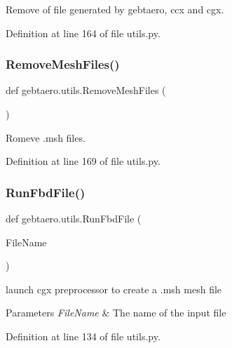 Remove of file generated by gebtaero, ccx and cgx. 



Definition at line 164 of file utils.\+py.

\mbox{\label{namespacegebtaero_1_1utils_a8f7dd7932f9ad411a1b153e1e17a4c62}} 
\subsubsection{\texorpdfstring{Remove\+Mesh\+Files()}{RemoveMeshFiles()}}
{\footnotesize\ttfamily def gebtaero.\+utils.\+Remove\+Mesh\+Files (\begin{DoxyParamCaption}{ }\end{DoxyParamCaption})}



Romeve .msh files. 



Definition at line 169 of file utils.\+py.

\mbox{\label{namespacegebtaero_1_1utils_a37d973efabdd0beca6418265ffa57d32}} 
\subsubsection{\texorpdfstring{Run\+Fbd\+File()}{RunFbdFile()}}
{\footnotesize\ttfamily def gebtaero.\+utils.\+Run\+Fbd\+File (\begin{DoxyParamCaption}\item[{}]{File\+Name }\end{DoxyParamCaption})}



launch cgx preprocessor to create a .msh mesh file 


\begin{DoxyParams}{Parameters}
{\em File\+Name} & The name of the input file \\
\hline
\end{DoxyParams}


Definition at line 134 of file utils.\+py.

\mbox{\label{namespacegebtaero_1_1utils_a553253bef10c3bec37dc0d858b03dc71}} 
